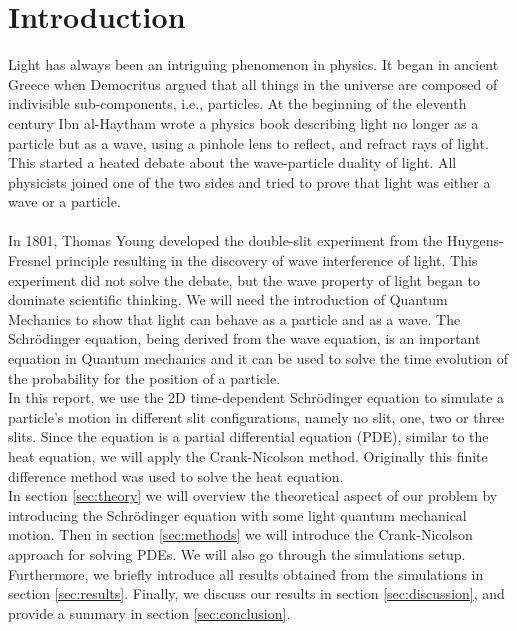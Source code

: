 \documentclass[english,notitlepage,reprint,nofootinbib]{revtex4-2}  %
\begin{document}
	\section{Introduction} \label{sec:introduction}
	\noindent
	Light has always been an intriguing phenomenon in physics. It began in ancient Greece when Democritus argued that all things in the universe are composed of indivisible
	sub-components, i.e., particles. At the beginning of the eleventh century Ibn al-Haytham
	wrote a physics book describing light no longer as a particle but as a wave, using a
	pinhole lens to reflect, and refract rays of light. This started a heated debate about the
	wave-particle duality of light. All physicists joined one of the two sides and tried to
	prove that light was either a wave or a particle. \\
	\noindent \\
	In 1801, Thomas Young developed the double-slit experiment from the Huygens-Fresnel principle
	resulting in the discovery of wave interference of light\cite{ThomasYoung}.
	This experiment did not solve the debate, but the wave property of light began to dominate
	scientific thinking. We will need the introduction of Quantum Mechanics to show that
	light can behave as a particle and as a wave. The Schrödinger equation, being derived
	from the wave equation, is an important equation in Quantum mechanics and it can be used to solve the time evolution of the probability for the position 
	of a particle.  \\

	\noindent
	In this report, we use the 2D time-dependent Schrödinger equation to simulate a particle's
	motion in different slit configurations, namely no slit, one, two or three slits. Since the equation is a partial differential equation (PDE), similar to the heat equation, we will apply the Crank-Nicolson method.
	Originally this finite difference method was used to solve the heat equation\cite{Crank1947APM}. \\

	\noindent
	In section \ref{sec:theory} we will overview the theoretical aspect of our problem by introducing
	the Schrödinger equation with some light quantum mechanical motion. Then in section \ref{sec:methods}
	we will introduce the Crank-Nicolson approach for solving PDEs. We will also go through the simulations setup. Furthermore, we briefly introduce all results obtained from the simulations in section
	\ref{sec:results}. Finally, we discuss our results in section \ref{sec:discussion}, and provide a summary
	in section \ref{sec:conclusion}.
\end{document}

